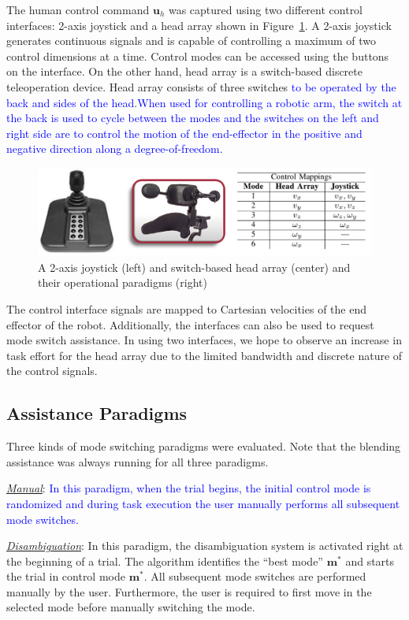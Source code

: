 \documentclass[conference]{IEEEtran}
\begin{document}
 The human control command $\boldsymbol{u}_h$ was captured using two different control interfaces: 2-axis joystick and a head array shown in Figure~\ref{J2_HA}. 
 A 2-axis joystick generates continuous signals and is capable of controlling a maximum of two control dimensions at a time. Control modes can be accessed using the buttons on the interface. 
 On the other hand, head array  is a switch-based discrete teleoperation device. Head array consists of three switches \textcolor{blue}{to be operated by the back and sides of the head}.\textcolor{blue}{When used for controlling a robotic arm, the switch at the back is used to cycle between the modes and the switches on the left and right side are to control the motion of the end-effector in the positive and negative direction along a degree-of-freedom.}
 \begin{figure}[h]
 	\centering
 	\includegraphics[width = 0.9\hsize, height = 0.12\vsize]{./figures/INTER.png}
 	\caption{A 2-axis joystick (left) and switch-based head array (center) and their operational paradigms (right)}
 	\label{J2_HA}
 \end{figure}
 
 
 The control interface signals are mapped to Cartesian velocities of the end effector of the robot. Additionally, the interfaces can also be used to request mode switch assistance. In using two interfaces, we hope to observe an increase in task effort for the head array due to the limited bandwidth and discrete nature of the control signals.
 \subsection{Assistance Paradigms}
 Three kinds of mode switching paradigms were evaluated. Note that the blending assistance was always running for all three paradigms.
 
 \noindent\underline{\textit{Manual}}: \textcolor{blue}{In this paradigm, when the trial begins, the initial control mode is randomized and during task execution the user manually performs all subsequent mode switches.}
 
 \noindent\underline{\textit{Disambiguation}}: In this paradigm, the disambiguation system is activated right at the beginning of a trial. The algorithm identifies the ``best mode'' $\boldsymbol{m}^*$ and starts the trial in control mode $\boldsymbol{m}^*$. All subsequent mode switches are performed manually by the user. Furthermore, the user is required to first move in the selected mode before manually switching the mode. 
 
\end{document}
